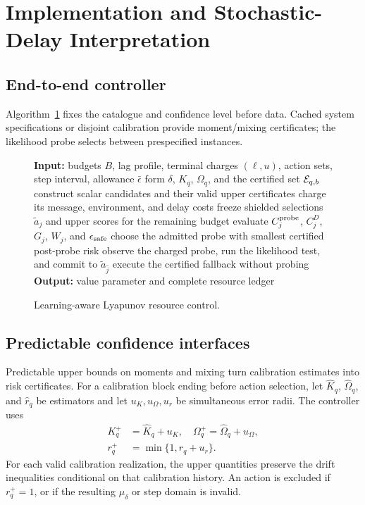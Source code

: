 \documentclass[journal]{IEEEtran}
\begin{document}
\section{Implementation and Stochastic-Delay Interpretation}
\subsection{End-to-end controller}
Algorithm~\ref{alg:controller} fixes the catalogue and confidence level before data.
Cached system specifications or disjoint calibration provide moment/mixing certificates; the likelihood probe selects between prespecified instances.

\begin{figure}[t]
\centering
\begin{minipage}{0.97\columnwidth}
\begin{algorithmic}[1]
\STATE \textbf{Input:} budgets $B$, lag profile, terminal charges $(\ell,u)$, action sets, step interval, allowance $\bar\epsilon$
\STATE form $\delta$, $K_q$, $\Omega_q$, and the certified set ${\cal E}_{q,b}$
\STATE construct scalar candidates and their valid upper certificates
\ENDFOR
{}
\STATE charge its message, environment, and delay costs
\STATE freeze shielded selections $\widetilde a_j$ and upper scores for the remaining budget
\STATE evaluate $C_j^{\rm probe}$, $C_j^D$, $G_j$, $W_j$, and $\epsilon_{\rm safe}$
\ENDFOR
{}
\STATE choose the admitted probe with smallest certified post-probe risk
\STATE observe the charged probe, run the likelihood test, and commit to $\widetilde a_{\widehat j}$
\ELSE
\STATE execute the certified fallback without probing
\ENDIF
\STATE \textbf{Output:} value parameter and complete resource ledger
\end{algorithmic}
\end{minipage}
\caption{Learning-aware Lyapunov resource control.}
\label{alg:controller}
\end{figure}


\subsection{Predictable confidence interfaces}
Predictable upper bounds on moments and mixing turn calibration estimates into risk certificates.
For a calibration block ending before action selection, let $\widehat K_q$, $\widehat\Omega_q$, and $\widehat r_q$ be estimators and let $u_K,u_\Omega,u_r$ be simultaneous error radii.
The controller uses
\begin{align}
K_q^+&=\widehat K_q+u_K,\quad
\Omega_q^+=\widehat\Omega_q+u_\Omega,\nonumber\\
r_q^+&=\min\{1,\widehat r_q+u_r\}.
\label{eq:upper-interfaces}
\end{align}
For each valid calibration realization, the upper quantities preserve the drift inequalities conditional on that calibration history.
An action is excluded if $r_q^+=1$, or if the resulting $\mu_\delta$ or step domain is invalid.
\end{document}
